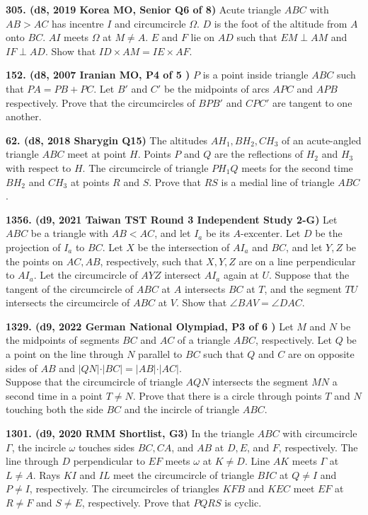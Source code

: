 \documentclass{article}
\begin{document}
\textbf{305. (\color{red}d8\color{black}, 2019 Korea MO, Senior Q6 of 8)} Acute triangle $ABC$ with $AB > AC$ has incentre $I$ and circumcircle $\Omega$. $D$ is the foot of the altitude from $A$ onto $BC$. $AI$ meets $\Omega$ at $M \neq A$. $E$ and $F$ lie on $AD$ such that $EM \perp AM$ and $IF \perp AD$. Show that $ID \times AM = IE \times AF$.

\textbf{152. (\color{red}d8\color{black}, 2007 Iranian MO, P4 of 5 )} $P$ is a point inside triangle $ABC$ such that $PA = PB + PC.$ Let $B'$ and $C'$ be the midpoints of arcs $APC$ and $APB$ respectively. Prove that the circumcircles of $BPB'$ and $CPC'$ are tangent to one another.

\textbf{62. (\color{red}d8\color{black}, 2018 Sharygin Q15)} The altitudes $AH_1,BH_2,CH_3$ of an acute-angled triangle $ABC$ meet at point $H$. Points $P$ and $Q$ are the reflections of $H_2$ and $H_3$ with respect to $H$. The circumcircle of triangle $PH_1Q$ meets for the second time $BH_2$ and $CH_3$ at points $R$ and $S$. Prove that $RS$ is a medial line of triangle $ABC$.

\textbf{1356. (\color{red}d9\color{black}, 2021 Taiwan TST Round 3 Independent Study 2-G)} Let $ABC$ be a triangle with $AB<AC$, and let $I_a$ be its $A$-excenter. Let $D$ be the projection of $I_a$ to $BC$. Let $X$ be the intersection of $AI_a$ and $BC$, and let $Y,Z$ be the points on $AC,AB$, respectively, such that $X,Y,Z$ are on a line perpendicular to $AI_a$. Let the circumcircle of $AYZ$ intersect $AI_a$ again at $U$. Suppose that the tangent of the circumcircle of $ABC$ at $A$ intersects $BC$ at $T$, and the segment $TU$ intersects the circumcircle of $ABC$ at $V$. Show that $\angle BAV=\angle DAC$.

\textbf{1329. (\color{red}d9\color{black}, 2022 German National Olympiad, P3 of 6 )} Let $M$ and $N$ be the midpoints of segments $BC$ and $AC$ of a triangle $ABC$, respectively. Let $Q$ be a point on the line through $N$ parallel to $BC$ such that $Q$ and $C$ are on opposite sides of $AB$ and $\vert QN\vert \cdot \vert BC\vert=\vert AB\vert \cdot \vert AC\vert$. \\

Suppose that the circumcircle of triangle $AQN$ intersects the segment $MN$ a second time in a point $T \ne N$.
Prove that there is a circle through points $T$ and $N$ touching both the side $BC$ and the incircle of triangle $ABC$.

\textbf{1301. (\color{red}d9\color{black}, 2020 RMM Shortlist, G3)} In the triangle $ABC$ with circumcircle $\Gamma$, the incircle $\omega$ touches sides $BC, CA$, and $AB$ at $D, E$, and $F$, respectively. The line through $D$ perpendicular to $EF$ meets $\omega$ at $K\neq D$. Line $AK$ meets $\Gamma$ at $L\neq A$. Rays $KI$ and $IL$ meet the circumcircle of triangle $BIC$ at $Q\neq I$ and $P\neq I$, respectively. The circumcircles of triangles $KFB$ and $KEC$ meet $EF$ at $R\neq F$ and $S\neq E$, respectively. Prove that $PQRS$ is cyclic.
\end{document}

